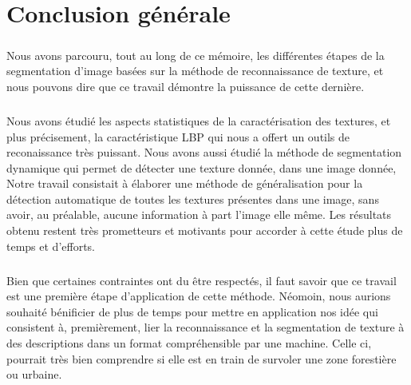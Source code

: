 
\chapter*{Conclusion générale}

\label{Chapter4} %



\paragraph*{}
Nous avons parcouru, tout au long de ce mémoire, les différentes étapes de la segmentation d'image basées sur la méthode de reconnaissance de texture, et nous pouvons dire que ce travail démontre la puissance de cette dernière.

\paragraph*{}
Nous avons étudié les aspects statistiques de la caractérisation des textures, et plus précisement, la caractéristique LBP qui nous a offert un outils de reconaissance très puissant. Nous avons aussi étudié la méthode de segmentation dynamique qui permet de détecter une texture donnée, dans une image donnée, 
Notre travail consistait à élaborer une méthode de généralisation pour la détection automatique de toutes les textures présentes dans une image, sans avoir, au préalable, aucune information à part l'image elle même.
Les résultats obtenu restent très prometteurs et motivants pour accorder à cette étude plus de temps et d'efforts. 

\paragraph*{}
Bien que certaines contraintes ont du être respectés, il faut savoir que ce travail est une première étape d'application de cette méthode. Néomoin, nous aurions souhaité bénificier de plus de temps pour mettre en application nos idée qui consistent à, premièrement, lier la reconnaissance et la segmentation de texture à des descriptions dans un format compréhensible par une machine. Celle ci, pourrait très bien comprendre si elle est en train de survoler une zone forestière ou urbaine. 

